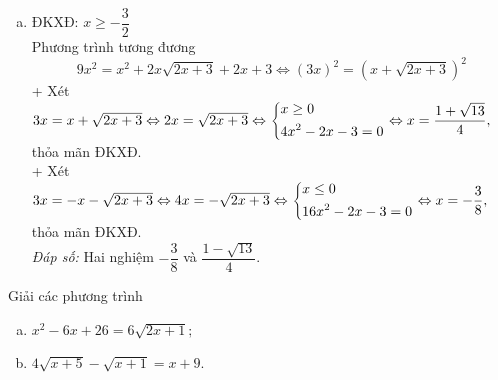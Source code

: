 \begin{bt}
{\begin{enumerate}[a)]
     		\item ĐKXĐ: $x\ge -\dfrac{3}{2}$\\
     		Phương trình tương  đương
     		$$9x^2=x^2+2x\sqrt{2x+3} +2x+3 \Leftrightarrow {\left(3x\right)}^2 ={\left(x+\sqrt{2x+3}\right)}^2$$
     		+ Xét $3x=x+\sqrt{2x+3}\Leftrightarrow 2x=\sqrt{2x+3}\\ \Leftrightarrow \left\{\begin{aligned}& x\ge 0\\ & 4x^2 -2x-3=0\end{aligned}\right.\Leftrightarrow x=\dfrac{1+\sqrt{13}}{4},$ thỏa  mãn ĐKXĐ.\\
     		+ Xét $3x=-x-\sqrt{2x+3}\Leftrightarrow 4x=-\sqrt{2x+3}\\ \Leftrightarrow \left\{\begin{aligned}& x\le 0\\ & 16x^2 -2x-3=0\end{aligned}\right.\Leftrightarrow x=-\dfrac{3}{8},$ thỏa  mãn ĐKXĐ.\\
     		\textit{Đáp số:}  Hai nghiệm $-\dfrac{3}{8}$ và $\dfrac{1-\sqrt{13}}{4}$.
     	\end{enumerate}
       }
\end{bt}


\begin{bt}
    Giải các phương trình
    \begin{enumerate}[a)]
		\item $x^2-6x+26=6\sqrt{2x+1};$
		\item $4\sqrt{x+5}-\sqrt{x+1}=x+9$.
	\end{enumerate}
\end{bt}


